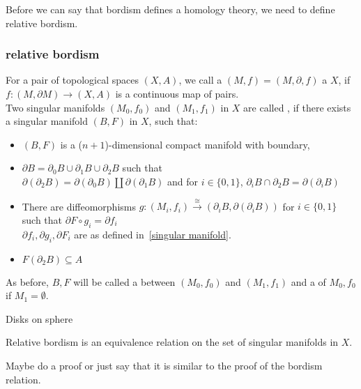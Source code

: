 \documentclass[a4paper,11pt]{article}
\begin{document}
Before we can say that bordism defines a homology theory, we need to define relative bordism.

\subsubsection{relative bordism}

\begin{definition}
    For a pair of topological spaces \((X,A)\), we call a \((M,f)=(M,\partial,f)\) a \(X\), if \(f:(M,\partial M)\to (X,A)\) is a continuous map of pairs.\\
    Two singular manifolds \((M_0,f_0)\) and \((M_1,f_1)\) in \(X\) are called , if there exists a singular manifold \((B,F)\) in \(X\), such that:
    \begin{itemize}
        \item \((B,F)\) is a (\(n+1\))-dimensional compact manifold with boundary,
        \item \(\partial B=\partial_0B\cup\partial_1B\cup\partial_2B\) such that \\
                \(\partial(\partial_2B)=\partial(\partial_0B)\amalg\partial(\partial_1B)\) and
                for \(i\in\{0,1\}\), \(\partial_i B\cap\partial_2B=\partial(\partial_i B)\)
        \item There are diffeomorphisms \(g:(M_i,f_i)\xrightarrow{\cong}(\partial_{i} B,\partial(\partial_{i}B))\) for \(i\in\{0,1\}\) such that \(\partial F\circ g_i=\partial f_i\)\\
        \(\partial f_i, \partial g_i, \partial F_i\) are as defined in\ \ref{singular manifold}.
        \item \(F(\partial_2B)\subseteq A\)
    \end{itemize}
    As before, \(B,F\) will be called a  between \((M_0,f_0)\) and \((M_1,f_1)\) and a  of \(M_0,f_0\) if \(M_1=\emptyset\).
\end{definition}

\begin{example}
    Disks on sphere
\end{example}

\begin{theorem}\cite[p.525]{dieck}
    Relative bordism is an equivalence relation on the set of singular manifolds in \(X\).
\end{theorem}

Maybe do a proof or just say that it is similar to the proof of the bordism relation.
\end{document}
